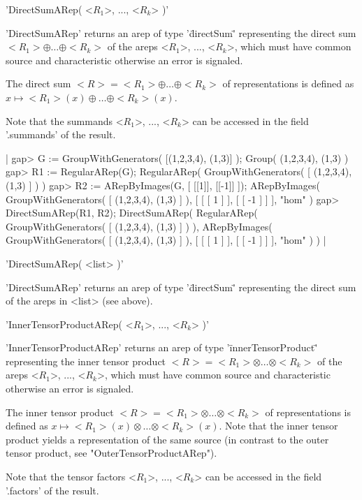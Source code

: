 
'DirectSumARep( <$R_1$>, ..., <$R_k$> )'

'DirectSumARep' returns an arep of type '\"directSum\"' 
representing the direct sum $<R_1>\oplus\dots\oplus <R_k>$ 
of the areps <$R_1$>, ..., <$R_k$>, 
which must have common source and characteristic otherwise an error is
signaled. 

The direct sum $<R> = <R_1>\oplus\dots\oplus <R_k>$ 
of representations is defined as 
$x\mapsto <R_1>(x)\oplus\dots\oplus <R_k>(x)$.

Note that the summands <$R_1$>, ..., <$R_k$> can be accessed 
in the field '.summands' of the result.

|    gap> G := GroupWithGenerators( [(1,2,3,4), (1,3)] );
    Group( (1,2,3,4), (1,3) )
    gap> R1 := RegularARep(G);
    RegularARep( GroupWithGenerators( [ (1,2,3,4), (1,3) ] ) )
    gap> R2 := ARepByImages(G, [ [[1]], [[-1]] ]);
    ARepByImages(
      GroupWithGenerators( [ (1,2,3,4), (1,3) ] ),
      [ [ [ 1 ] ], [ [ -1 ] ] ],
      "hom"
    )
    gap> DirectSumARep(R1, R2);
    DirectSumARep(
      RegularARep( GroupWithGenerators( [ (1,2,3,4), (1,3) ] ) ),
      ARepByImages(
        GroupWithGenerators( [ (1,2,3,4), (1,3) ] ),
        [ [ [ 1 ] ], [ [ -1 ] ] ],
        "hom"
      )
    ) |

'DirectSumARep( <list> )'

'DirectSumARep' returns an arep of type '\"directSum\"' representing
the direct sum of the areps in <list> (see above).

'InnerTensorProductARep( <$R_1$>, ..., <$R_k$> )'

'InnerTensorProductARep' returns an arep of type 
'\"innerTensorProduct\"' representing the inner tensor product 
$<R> = <R_1>\otimes\dots\otimes <R_k>$ of the areps <$R_1$>, ..., <$R_k$>, 
which must have common source and characteristic otherwise an error is
signaled. 

The inner tensor product $<R> = <R_1>\otimes\dots\otimes <R_k>$ 
of representations is
defined as $x\mapsto <R_1>(x)\otimes\dots\otimes <R_k>(x)$. Note 
that the inner tensor product yields a representation of the 
same source (in contrast to the outer tensor product, see 
"OuterTensorProductARep").

Note that the tensor factors <$R_1$>, ..., <$R_k$> can be accessed 
in the field '.factors' of the result.

